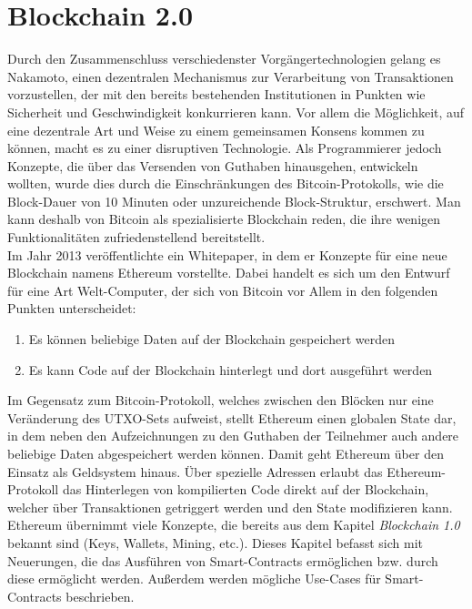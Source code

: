 \chapter{Blockchain 2.0}
Durch den Zusammenschluss verschiedenster Vorgängertechnologien gelang es Nakamoto, einen dezentralen Mechanismus zur Verarbeitung von Transaktionen vorzustellen, der mit den bereits bestehenden Institutionen in Punkten wie Sicherheit und Geschwindigkeit konkurrieren kann. Vor allem die Möglichkeit, auf eine dezentrale Art und Weise zu einem gemeinsamen Konsens kommen zu können, macht es zu einer disruptiven Technologie. Als Programmierer jedoch Konzepte, die über das Versenden von Guthaben hinausgehen, entwickeln wollten, wurde dies durch die Einschränkungen des Bitcoin-Protokolls, wie die Block-Dauer von 10 Minuten oder unzureichende Block-Struktur, erschwert. Man kann deshalb von Bitcoin als spezialisierte Blockchain reden, die ihre wenigen Funktionalitäten zufriedenstellend bereitstellt.\\

Im Jahr 2013 veröffentlichte \cite{buterin_whitepaper_2013} ein Whitepaper, in dem er Konzepte für eine neue Blockchain namens Ethereum vorstellte. Dabei handelt es sich um den Entwurf für eine Art Welt-Computer, der sich von Bitcoin vor Allem in den folgenden Punkten unterscheidet:
\begin{enumerate}
	\item Es können beliebige Daten auf der Blockchain gespeichert werden
	\item Es kann Code auf der Blockchain hinterlegt und dort ausgeführt werden
	\end{enumerate}
Im Gegensatz zum Bitcoin-Protokoll, welches zwischen den Blöcken nur eine Veränderung des UTXO-Sets aufweist, stellt Ethereum einen globalen State dar, in dem neben den Aufzeichnungen zu den Guthaben der Teilnehmer auch andere beliebige Daten abgespeichert werden können. Damit geht Ethereum über den Einsatz als Geldsystem hinaus.
Über spezielle Adressen erlaubt das Ethereum-Protokoll das Hinterlegen von kompilierten Code direkt auf der Blockchain, welcher über Transaktionen getriggert werden und den State modifizieren kann. 
\\

Ethereum übernimmt viele Konzepte, die bereits aus dem Kapitel \emph{Blockchain 1.0} bekannt sind (Keys, Wallets, Mining, etc.). Dieses Kapitel befasst sich mit Neuerungen, die das Ausführen von Smart-Contracts ermöglichen bzw. durch diese ermöglicht werden. Außerdem werden mögliche Use-Cases für Smart-Contracts beschrieben.
